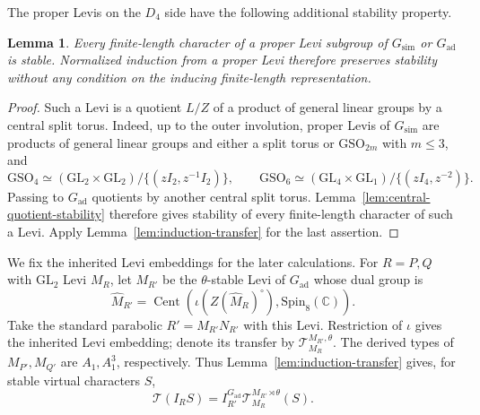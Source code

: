 \documentclass[12pt]{amsart}
\theoremstyle{definition}
\theoremstyle{plain}
\newtheorem{lemma}[definition]{Lemma}
\theoremstyle{remark}
\def\C{\mathbb{C}}%
\def\GL{\mathrm{GL}}
\def\GSO{\mathrm{GSO}}
\def\Spin{\mathrm{Spin}}
\DeclareMathOperator{\Cent}{Cent}%
\numberwithin{equation}{section}
\begin{document}
The proper Levis on the $D_4$ side have the following additional
stability property.

\begin{lemma}\label{lem:proper-Levi-stable}
Every finite-length character of a proper Levi subgroup of $G_{\mathrm{sim}}$
or $G_{\mathrm{ad}}$ is stable. Normalized induction from a proper Levi
therefore preserves stability without any condition on the inducing
finite-length representation.
\end{lemma}
\begin{proof}
Such a Levi is a quotient $L/Z$ of a product of general linear groups
by a central split torus. Indeed, up to the outer involution, proper
Levis of $G_{\mathrm{sim}}$ are products of general linear groups and either
a split torus or $\GSO_{2m}$ with $m\leq3$, and
\[
 \GSO_4\simeq(\GL_2\times\GL_2)/\{(zI_2,z^{-1}I_2)\},\qquad
 \GSO_6\simeq(\GL_4\times\GL_1)/\{(zI_4,z^{-2})\}.
\]
Passing to $G_{\mathrm{ad}}$ quotients by another central split torus.
Lemma~\ref{lem:central-quotient-stability} therefore gives stability
of every finite-length character of such a Levi. Apply
Lemma~\ref{lem:induction-transfer} for the last assertion.
\end{proof}

We fix the inherited Levi embeddings for the later calculations.
For $R=P,Q$ with $\GL_2$ Levi $M_R$, let $M_{R'}$ be the
$\theta$-stable Levi of $G_{\mathrm{ad}}$ whose dual group is
\[
 \widehat M_{R'}=\Cent(\iota(Z(\widehat M_R)^\circ),\Spin_8(\C)).
\]
Take the standard parabolic $R'=M_{R'}N_{R'}$ with this Levi.
Restriction of $\iota$ gives the inherited Levi embedding; denote
its transfer by $\mathcal T_{M_R}^{M_{R'},\theta}$. The derived types
of $M_{P'},M_{Q'}$ are $A_1,A_1^3$, respectively. Thus
Lemma~\ref{lem:induction-transfer} gives, for stable virtual characters $S$,
\[
      \mathcal T(I_R S)=I_{R'}^{G_{\mathrm{ad}}}
      \mathcal T_{M_R}^{M_{R'} \rtimes \theta}(S).
\]
\end{document}
